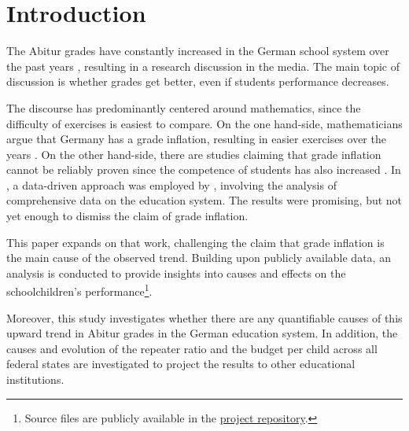 \section{Introduction} \label{sec:Introduction}
The Abitur grades have constantly increased in the German school system over the past years \cite{kultusminister_konferenz_abiturnoten_nodate}, resulting in a research discussion in the media. The main topic of discussion is whether grades get better, even if students performance decreases.

The discourse has predominantly centered around mathematics, since the difficulty of exercises is easiest to compare. On the one hand-side, mathematicians argue that Germany has a grade inflation, resulting in easier exercises over the years \cite{kuhnel_modellierungskompetenz_2015, jahnke_hamburger_2014,lemmermeyer_zentralabitur_nodate}. On the other hand-side, there are studies claiming that grade inflation cannot be reliably proven since the competence of students has also increased \cite{schleithoff_noteninflation_2015}. In \citeyear{grozinger_gibt_2015}, a data-driven approach was employed by \citeauthor{grozinger_gibt_2015}, involving the analysis of comprehensive data on the education system. The results were promising, but not yet enough to dismiss the claim of grade inflation.

This paper expands on that work, challenging the claim that grade inflation is the main cause of the observed trend. Building upon publicly available data, an analysis is conducted to provide insights into causes and effects on the schoolchildren's performance\footnote{Source files are publicly available in the \href{https://github.com/KarylReyne/DataLiteracyWS23}{project repository}.}.

Moreover, this study investigates whether there are any quantifiable causes of this upward trend in Abitur grades in the German education system. In addition, the causes and evolution of the repeater ratio and the budget per child across all federal states are investigated to project the results to other educational institutions.

